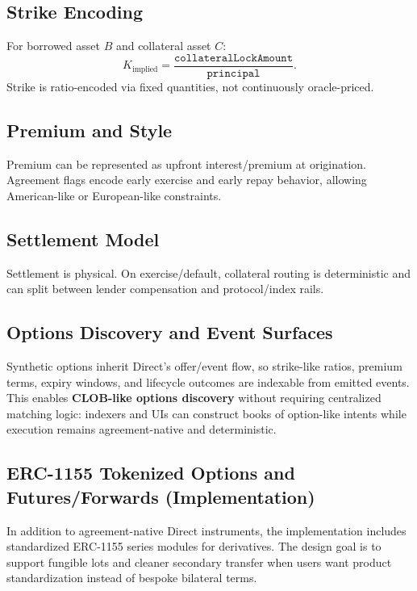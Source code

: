 \documentclass[version=preprint]{iacrcc}
\begin{document}
\subsection{Strike Encoding}

For borrowed asset $B$ and collateral asset $C$:
\[
K_{\text{implied}} = \frac{\texttt{collateralLockAmount}}{\texttt{principal}}.
\]
Strike is ratio-encoded via fixed quantities, not continuously oracle-priced.

\subsection{Premium and Style}

Premium can be represented as upfront interest/premium at origination. Agreement flags encode early exercise and early repay behavior, allowing American-like or European-like constraints.

\subsection{Settlement Model}

Settlement is physical. On exercise/default, collateral routing is deterministic and can split between lender compensation and protocol/index rails.

\subsection{Options Discovery and Event Surfaces}

Synthetic options inherit Direct's offer/event flow, so strike-like ratios, premium terms, expiry windows, and lifecycle outcomes are indexable from emitted events. This enables \textbf{CLOB-like options discovery} without requiring centralized matching logic: indexers and UIs can construct books of option-like intents while execution remains agreement-native and deterministic.

\subsection{ERC-1155 Tokenized Options and Futures/Forwards (Implementation)}

In addition to agreement-native Direct instruments, the implementation includes standardized ERC-1155 series modules for derivatives. The design goal is to support fungible lots and cleaner secondary transfer when users want product standardization instead of bespoke bilateral terms.
\end{document}
